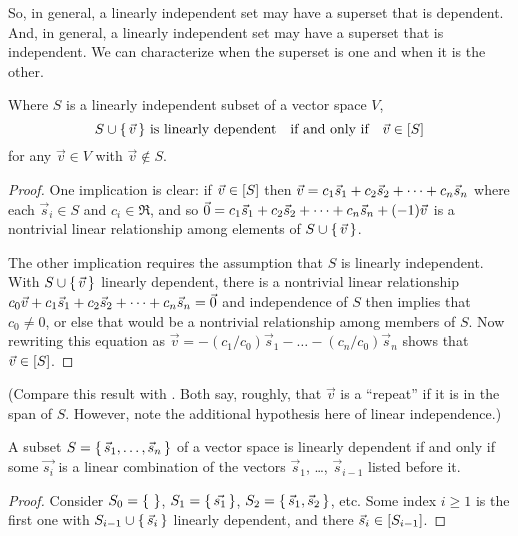 So, in general, a linearly independent set 
may have a superset that is dependent.
And, in general, a  
linearly independent set may  have a superset that is independent.
We can characterize when the superset is one and when it is the other.

\begin{lemma} \label{le:SUnionXiLIIffXiNotInSpan}
Where \( S \) is a linearly independent subset of a vector space \( V \),
\begin{equation*}
  S\cup\mbox{$\{\,\vec{v}\,\}$}\text{\ is linearly dependent}
  \quad\text{if and only if}\quad
  \vec{v}\in\relax [S\relax ]
\end{equation*}
for any \( \vec{v}\in V \) with \( \vec{v}\not\in S \).
\end{lemma}

\begin{proof}
One implication is clear: if \( \vec{v}\in\relax [S\relax ] \) then
\( \vec{v}=c_1\vec{s}_1+c_2\vec{s}_2+\cdots +c_n\vec{s}_n \) where each \( \vec{s}_i\in S \) and
\( c_i\in\Re \), and so \( \vec{0}=c_1\vec{s}_1+c_2\vec{s}_2+\cdots +c_n\vec{s}_n+(-1)\vec{v} \)
is a nontrivial linear relationship among elements of
\( S\cup\mbox{$\{\,\vec{v}\,\}$} \).

The other implication requires the assumption that \( S \) is linearly
independent.
With \( S\cup\mbox{$\{\,\vec{v}\,\}$} \) linearly dependent, there is a
nontrivial linear relationship \( c_0\vec{v}+c_1\vec{s}_1+c_2\vec{s}_2+\cdots +c_n\vec{s}_n=\vec{0} \)
and independence of $S$ then implies that \( c_0\neq 0 \), 
or else that would be a nontrivial
relationship among members of \( S \).
Now rewriting this equation as
\( \vec{v}=-(c_1/c_0)\vec{s}_1-\dots-(c_n/c_0)\vec{s}_n \) shows
that \( \vec{v}\in\relax [S\relax ] \).
\end{proof}

\noindent
(Compare this result with .
Both say, roughly, that $\vec{v}$ is a ``repeat'' if it is in the
span of $S$.
However, note the additional hypothesis here of linear independence.)

\begin{corollary}
\label{cor:LDMeansLC}
A subset \( S=\mbox{$\{\,\vec{s}_1,\dots,\vec{s}_n\,\}$} \) of a vector space
is linearly dependent if and only if some \( \vec{s_i} \)
is a linear combination of the vectors 
\( \vec{s}_1 \), \ldots, \( \vec{s}_{i-1} \)
listed before it.
\end{corollary}

\begin{proof}
Consider \( S_0=\mbox{$\{\,\,\}$} \), \( S_1=\mbox{$\{\,\vec{s_1}\,\}$} \),
\( S_2=\mbox{$\{\,\vec{s}_1,\vec{s}_2 \,\}$} \), etc.
Some index \( i\geq 1 \) is the first one with
\( S_{i-1}\cup\mbox{$\{\,\vec{s}_i \,\}$} \)
linearly dependent, and there \( \vec{s}_i\in\relax [ S_{i-1} \relax ] \).
\end{proof}

